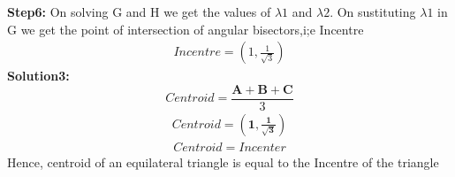 \documentclass[10pt,a4paper]{report}
\let\vec\mathbf
\begin{document}
\begin{multicols}{2}
\textbf{Step6:} On solving G and H we get the values of $\lambda1$ and $\lambda2$. On sustituting $\lambda1$ in G we get the point of intersection of angular bisectors,i;e Incentre
\begin{align}
\boxed{Incentre = (1,\frac{1}{\sqrt{3}})}
\end{align}
\newline
\textbf{Solution3:}
\begin{equation}
Centroid = \frac{\vec{A+B+C}}{3}
\end{equation}
\begin{align}
Centroid=\vec{(1,\frac{1}{\sqrt{3}})}
\end{align}
\begin{align} 
\boxed{Centroid={Incenter}}
\end{align}
Hence, centroid of an equilateral triangle is equal to the Incentre of the triangle
\end{multicols}
\end{document}
